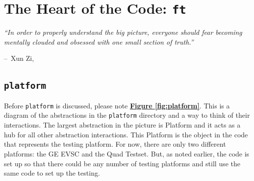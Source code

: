 \documentclass{report}
\makeatletter
\newenvironment{chapquote}[2][2em]
  {\setlength{\@tempdima}{#1}%
   \def\chapquote@author{#2}%
   \parshape 1 \@tempdima \dimexpr\textwidth-2\@tempdima\relax%
   \itshape}
  {\par\normalfont\hfill--\ \chapquote@author\hspace*{\@tempdima}\par\bigskip}
\makeatother
\begin{document}
	\begin{minipage}{\linewidth}
		\label{fig:lib/ui}
	\end{minipage}

\chapter{The Heart of the Code: \texttt{ft}}
\begin{chapquote}{Xun Zi, \textit{}}
``In order to properly understand the big picture, everyone should fear becoming mentally clouded and obsessed with one small section of truth.''
\end{chapquote}


\section{\texttt{platform}}
Before \texttt{platform} is discussed, please note \hyperref[fig:platform]{\textbf{Figure \ref{fig:platform}}}. This is a diagram of the abstractions in the \texttt{platform} directory and a way to think of their interactions. The largest abstraction in the picture is Platform and it acts as a hub for all other abstraction interactions. This Platform is the object in the code that represents the testing platform. For now, there are only two different platforms: the GE EVSC and the Quad Testset. But, as noted earlier, the code is set up so that there could be any number of testing platforms and still use the same code to set up the testing. 
\end{document}
